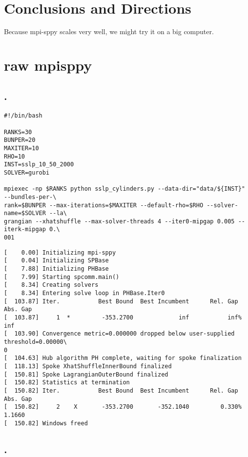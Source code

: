 \documentclass{article}
\begin{document}
\section{Conclusions and Directions}

Because mpi-sppy scales very well, we might try it on a big computer.




\appendix
\section{raw mpisppy}

\subsection{.}

\begin{verbatim}
#!/bin/bash

RANKS=30
BUNPER=20
MAXITER=10
RHO=10
INST=sslp_10_50_2000
SOLVER=gurobi

mpiexec -np $RANKS python sslp_cylinders.py --data-dir="data/${INST}" --bundles-per-\
rank=$BUNPER --max-iterations=$MAXITER --default-rho=$RHO --solver-name=$SOLVER --la\
grangian --xhatshuffle --max-solver-threads 4 --iter0-mipgap 0.005 --iterk-mipgap 0.\
001
\end{verbatim}


\begin{verbatim}
[    0.00] Initializing mpi-sppy
[    0.04] Initializing SPBase
[    7.88] Initializing PHBase
[    7.99] Starting spcomm.main()
[    8.34] Creating solvers
[    8.34] Entering solve loop in PHBase.Iter0
[  103.87] Iter.           Best Bound  Best Incumbent      Rel. Gap        Abs. Gap
[  103.87]     1  *         -353.2700             inf           inf%             inf
[  103.90] Convergence metric=0.000000 dropped below user-supplied threshold=0.00000\
0
[  104.63] Hub algorithm PH complete, waiting for spoke finalization
[  118.13] Spoke XhatShuffleInnerBound finalized
[  150.81] Spoke LagrangianOuterBound finalized
[  150.82] Statistics at termination
[  150.82] Iter.           Best Bound  Best Incumbent      Rel. Gap        Abs. Gap
[  150.82]     2    X       -353.2700       -352.1040         0.330%          1.1660
[  150.82] Windows freed
\end{verbatim}


\subsection*{.}
\end{document}
